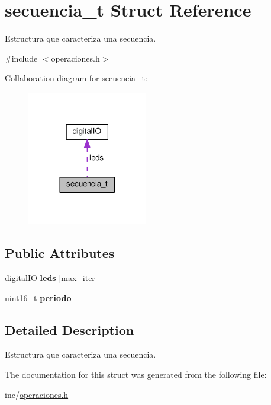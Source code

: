 \hypertarget{structsecuencia__t}{}\section{secuencia\+\_\+t Struct Reference}
\label{structsecuencia__t}


Estructura que caracteriza una secuencia.  




{\ttfamily \#include $<$operaciones.\+h$>$}



Collaboration diagram for secuencia\+\_\+t\+:\nopagebreak
\begin{figure}[H]
\begin{center}
\leavevmode
\includegraphics[width=149pt]{structsecuencia__t__coll__graph}
\end{center}
\end{figure}
\subsection*{Public Attributes}
\begin{DoxyCompactItemize}
\item 
\hyperlink{structdigital_i_o}{digital\+IO} {\bfseries leds} \mbox{[}max\+\_\+iter\mbox{]}
\item 
uint16\+\_\+t {\bfseries periodo}
\end{DoxyCompactItemize}


\subsection{Detailed Description}
Estructura que caracteriza una secuencia. 

The documentation for this struct was generated from the following file\+:\begin{DoxyCompactItemize}
\item 
inc/\hyperlink{operaciones_8h}{operaciones.\+h}\end{DoxyCompactItemize}
